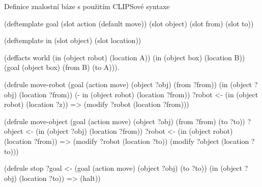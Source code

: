 \begin{listing}[t]
\caption{Definice znalostní báze s použitím CLIPSové syntaxe}
\label{clips syntax}
\begin{clcode}
(deftemplate goal
  (slot action (default move))
  (slot object)
  (slot from)
  (slot to))

(deftemplate in
  (slot object)
  (slot location))

(deffacts world
  (in (object robot) (location A))
  (in (object box) (location B))
  (goal (object box) (from B) (to A))).

(defrule move-robot
  (goal (action move) (object ?obj) (from ?from))
  (in (object ?obj) (location ?from))
  (- in (object robot) (location ?from))
  ?robot <- (in (object robot) (location ?z))
  =>
  (modify ?robot (location ?from)))

(defrule move-object
  (goal (action move) (object ?obj) (from ?from) (to ?to))
  ?object <- (in (object ?obj) (location ?from))
  ?robot <- (in (object robot) (location ?from))
  =>
  (modify ?robot (location ?to))
  (modify ?object (location ?to)))

(defrule stop
  ?goal <- (goal (action move) (object ?obj) (to ?to))
  (in (object ?obj) (location ?to))
  =>
  (halt))
\end{clcode}
\end{listing}

\FloatBarrier
